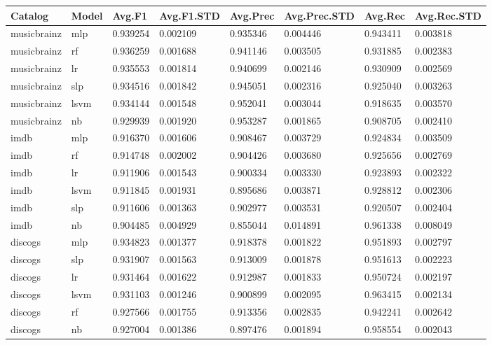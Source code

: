 \documentclass[epsfig,a4paper,11pt,titlepage,twoside,openany]{book}
\begin{document}
\begin{longtable}{|l|l|l|l|l|l|l|l|}
\hline
Catalog     & Model & Avg.F1   & Avg.F1.STD & Avg.Prec & Avg.Prec.STD & Avg.Rec  & Avg.Rec.STD \\ \hline
musicbrainz & mlp   & 0.939254 & 0.002109   & 0.935346 & 0.004446     & 0.943411 & 0.003818    \\
musicbrainz & rf    & 0.936259 & 0.001688   & 0.941146 & 0.003505     & 0.931885 & 0.002383    \\
musicbrainz & lr    & 0.935553 & 0.001814   & 0.940699 & 0.002146     & 0.930909 & 0.002569    \\
musicbrainz & slp   & 0.934516 & 0.001842   & 0.945051 & 0.002316     & 0.925040 & 0.003263    \\
musicbrainz & lsvm  & 0.934144 & 0.001548   & 0.952041 & 0.003044     & 0.918635 & 0.003570    \\
musicbrainz & nb    & 0.929939 & 0.001920   & 0.953287 & 0.001865     & 0.908705 & 0.002410    \\ \hline
imdb        & mlp   & 0.916370 & 0.001606   & 0.908467 & 0.003729     & 0.924834 & 0.003509    \\
imdb        & rf    & 0.914748 & 0.002002   & 0.904426 & 0.003680     & 0.925656 & 0.002769    \\
imdb        & lr    & 0.911906 & 0.001543   & 0.900334 & 0.003330     & 0.923893 & 0.002322    \\
imdb        & lsvm  & 0.911845 & 0.001931   & 0.895686 & 0.003871     & 0.928812 & 0.002306    \\
imdb        & slp   & 0.911606 & 0.001363   & 0.902977 & 0.003531     & 0.920507 & 0.002404    \\
imdb        & nb    & 0.904485 & 0.004929   & 0.855044 & 0.014891     & 0.961338 & 0.008049    \\ \hline
discogs     & mlp   & 0.934823 & 0.001377   & 0.918378 & 0.001822     & 0.951893 & 0.002797    \\
discogs     & slp   & 0.931907 & 0.001563   & 0.913009 & 0.001878     & 0.951613 & 0.002223    \\
discogs     & lr    & 0.931464 & 0.001622   & 0.912987 & 0.001833     & 0.950724 & 0.002197    \\
discogs     & lsvm  & 0.931103 & 0.001246   & 0.900899 & 0.002095     & 0.963415 & 0.002134    \\
discogs     & rf    & 0.927566 & 0.001755   & 0.913356 & 0.002835     & 0.942241 & 0.002642    \\
discogs     & nb    & 0.927004 & 0.001386   & 0.897476 & 0.001894     & 0.958554 & 0.002043    \\ \hline
\end{longtable}
\end{document}
